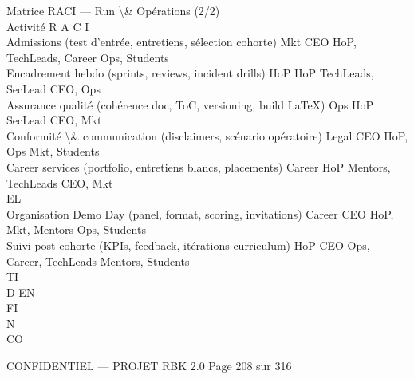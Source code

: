 \vspace{0.5em}
\vspace{0.5em}
Matrice RACI — Run \textbackslash{}& Opérations (2/2)\\
\vspace{0.5em}
\vspace{0.5em}
Activité                                                            R      A    C                        I\\
Admissions (test d’entrée, entretiens, sélection cohorte)           Mkt    CEO HoP, TechLeads, Career Ops, Students\\
Encadrement hebdo (sprints, reviews, incident drills)               HoP    HoP TechLeads, SecLead        CEO, Ops\\
Assurance qualité (cohérence doc, ToC, versioning, build LaTeX) Ops        HoP SecLead                   CEO, Mkt\\
Conformité \textbackslash{}& communication (disclaimers, scénario opératoire) Legal        CEO HoP, Ops                  Mkt, Students\\
Career services (portfolio, entretiens blancs, placements)          Career HoP Mentors, TechLeads        CEO, Mkt\\
\vspace{0.5em}
\vspace{0.5em}
\vspace{0.5em}
\vspace{0.5em}
EL\\
Organisation Demo Day (panel, format, scoring, invitations)         Career CEO HoP, Mkt, Mentors         Ops, Students\\
Suivi post-cohorte (KPIs, feedback, itérations curriculum)          HoP    CEO Ops, Career, TechLeads Mentors, Students\\
\vspace{0.5em}
\vspace{0.5em}
\vspace{0.5em}
\vspace{0.5em}
TI\\
D    EN\\
FI\\
N\\
CO\\
\vspace{0.5em}
\vspace{0.5em}
\vspace{0.5em}
\vspace{0.5em}
\begin{confidential}CONFIDENTIEL — PROJET RBK 2.0                                  Page 208 sur 316\end{confidential}
